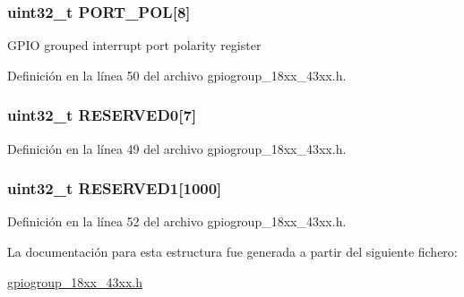 \subsubsection[{\texorpdfstring{P\+O\+R\+T\+\_\+\+P\+OL}{PORT_POL}}]{ uint32\+\_\+t P\+O\+R\+T\+\_\+\+P\+OL\mbox{[}8\mbox{]}}\hypertarget{struct_l_p_c___g_p_i_o_g_r_o_u_p_i_n_t___t_a31a0cb631ddc723b8277b38f7c169cc9}{}\label{struct_l_p_c___g_p_i_o_g_r_o_u_p_i_n_t___t_a31a0cb631ddc723b8277b38f7c169cc9}
G\+P\+IO grouped interrupt port polarity register 

Definición en la línea 50 del archivo gpiogroup\+\_\+18xx\+\_\+43xx.\+h.

\subsubsection[{\texorpdfstring{R\+E\+S\+E\+R\+V\+E\+D0}{RESERVED0}}]{ uint32\+\_\+t R\+E\+S\+E\+R\+V\+E\+D0\mbox{[}7\mbox{]}}\hypertarget{struct_l_p_c___g_p_i_o_g_r_o_u_p_i_n_t___t_aed987d938203d539600a9b6c6f221ad4}{}\label{struct_l_p_c___g_p_i_o_g_r_o_u_p_i_n_t___t_aed987d938203d539600a9b6c6f221ad4}


Definición en la línea 49 del archivo gpiogroup\+\_\+18xx\+\_\+43xx.\+h.

\subsubsection[{\texorpdfstring{R\+E\+S\+E\+R\+V\+E\+D1}{RESERVED1}}]{\setlength{\rightskip}{0pt plus 5cm}uint32\+\_\+t R\+E\+S\+E\+R\+V\+E\+D1\mbox{[}1000\mbox{]}}\hypertarget{struct_l_p_c___g_p_i_o_g_r_o_u_p_i_n_t___t_ad63c2ea328b20476d7137cab031e6e09}{}\label{struct_l_p_c___g_p_i_o_g_r_o_u_p_i_n_t___t_ad63c2ea328b20476d7137cab031e6e09}


Definición en la línea 52 del archivo gpiogroup\+\_\+18xx\+\_\+43xx.\+h.



La documentación para esta estructura fue generada a partir del siguiente fichero\+:\begin{DoxyCompactItemize}
\item 
\hyperlink{gpiogroup__18xx__43xx_8h}{gpiogroup\+\_\+18xx\+\_\+43xx.\+h}\end{DoxyCompactItemize}
